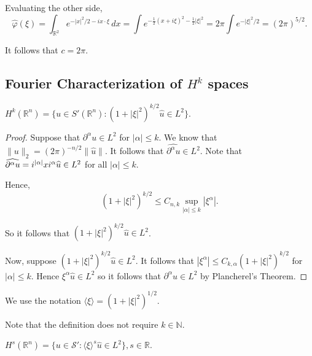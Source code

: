 \documentclass[12pt]{scrartcl}
\newcommand{\N}{\mathbb{N}}
\newcommand{\R}{\mathbb{R}}
\renewcommand{\hat}{\widehat}
\newcommand{\<}{\langle}
\renewcommand{\>}{\rangle}
\let \phi \varphi
\let \mc \mathcal
\begin{document}
Evaluating the other side,  
$$\hat{\phi}(\xi) = \int_{\R^2} e^{-|x|^2/2 - ix\cdot \xi}\,dx = \int e^{-\frac{1}{2}(x + i\xi)^2 - \frac{1}{2} |\xi|^2} = 2\pi \int e^{-|\xi|^2/2} = (2\pi)^{5/2}.$$

It follows that $c = 2\pi$.
\subsection{Fourier Characterization of $H^k$ spaces}
\begin{thm} $H^k(\R^n) = \{u \in S'(\R^n) : (1 + |\xi|^2)^{k/2} \hat{u} \in L^2\}.$
\end{thm}
\begin{proof}
Suppose that $\partial^\alpha u \in L^2$ for $|\alpha| \le k$.  We know that $\|u\|_{2} = (2\pi)^{-n/2}\|\hat{u}\|.$  It follows that $\hat{\partial^\alpha u} \in L^2$.  Note that $\hat{\partial^\alpha u} = i^{|\alpha|} \\xi^{\alpha} \hat{u} \in L^2$ for all $|\alpha| \le k$.

Hence,
$$(1 + |\xi|^2)^{k/2} \le C_{n, k} \sup_{|\alpha| \le k} |\xi^\alpha|.$$

So it follows that $(1 + |\xi|^2)^{k/2} \hat{u} \in L^2$.

Now, suppose $(1 + |\xi|^2)^{k/2} \hat{u} \in L^2$.  It follows that $|\xi^\alpha| \le C_{k, \alpha}(1 + |\xi|^2)^{k/2}$ for $|\alpha| \le k$.  Hence $\xi^\alpha\hat{u} \in L^2$ so it follows that $\partial^{\alpha} u \in L^2$ by Plancherel's Theorem.  

\end{proof}

\begin{remark}We use the notation $\<\xi\> = (1 + |\xi|^2)^{1/2}$.
\end{remark}

Note that the definition does not require $k \in \N$.  
\begin{definition} $H^s(\R^n) = \{u \in \mc S' : \<\xi \>^s \hat{u} \in L^2\}, s \in \R$.
\end{definition}
\end{document}
